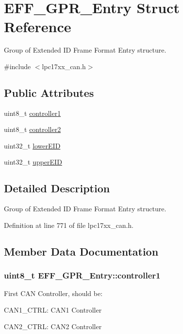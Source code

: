 \hypertarget{struct_e_f_f___g_p_r___entry}{\section{\-E\-F\-F\-\_\-\-G\-P\-R\-\_\-\-Entry \-Struct \-Reference}
\label{struct_e_f_f___g_p_r___entry}
}


\-Group of \-Extended \-I\-D \-Frame \-Format \-Entry structure.  




{\ttfamily \#include $<$lpc17xx\-\_\-can.\-h$>$}

\subsection*{\-Public \-Attributes}
\begin{DoxyCompactItemize}
\item 
uint8\-\_\-t \hyperlink{struct_e_f_f___g_p_r___entry_a9c87d19fd4bac0f3684732d1b221d260}{controller1}
\item 
uint8\-\_\-t \hyperlink{struct_e_f_f___g_p_r___entry_a9db07b6510572b13a4149eb110f7fe12}{controller2}
\item 
uint32\-\_\-t \hyperlink{struct_e_f_f___g_p_r___entry_aa849f69271154ced3bcdc83807078404}{lower\-E\-I\-D}
\item 
uint32\-\_\-t \hyperlink{struct_e_f_f___g_p_r___entry_a95da04e82c6e0f5528daf08398257f62}{upper\-E\-I\-D}
\end{DoxyCompactItemize}


\subsection{\-Detailed \-Description}
\-Group of \-Extended \-I\-D \-Frame \-Format \-Entry structure. 

\-Definition at line 771 of file lpc17xx\-\_\-can.\-h.



\subsection{\-Member \-Data \-Documentation}
\hypertarget{struct_e_f_f___g_p_r___entry_a9c87d19fd4bac0f3684732d1b221d260}{
\subsubsection[{controller1}]{\setlength{\rightskip}{0pt plus 5cm}uint8\-\_\-t {\bf \-E\-F\-F\-\_\-\-G\-P\-R\-\_\-\-Entry\-::controller1}}}\label{struct_e_f_f___g_p_r___entry_a9c87d19fd4bac0f3684732d1b221d260}
\-First \-C\-A\-N \-Controller, should be\-:
\begin{DoxyItemize}
\item \-C\-A\-N1\-\_\-\-C\-T\-R\-L\-: \-C\-A\-N1 \-Controller
\item \-C\-A\-N2\-\_\-\-C\-T\-R\-L\-: \-C\-A\-N2 \-Controller 
\end{DoxyItemize}

